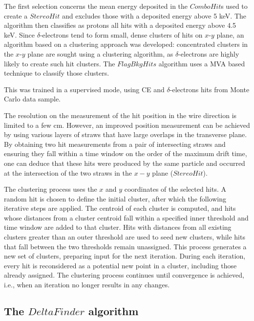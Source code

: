 The first selection concerns the 
mean energy deposited in  
the $ComboHit$s used to create a 
$StereoHit$ and excludes 
those with a deposited energy above 5 keV. 
The algorithm then classifies as 
protons all hits with a deposited 
energy above 4.5 keV.
Since $\delta$-electrons tend to form small, dense 
clusters of hits on $x$-$y$ plane, an algorithm based on a clustering 
approach was developed: concentrated clusters in the 
$x$-$y$ plane are sought using a clustering algorithm, 
as $\delta$-electrons are highly likely to create 
such hit clusters.
The $FlagBkgHits$ algorithm uses  
a MVA based technique to classify those clusters.

This was trained in a supervised mode, 
using CE and $\delta$-electrons hits from 
Monte Carlo data sample.

The resolution on the measurement of the 
hit position in the wire direction is limited to a few cm. 
However, an improved position measurement can be 
achieved by using various layers of straws that have large overlaps in the transverse plane. 
By obtaining two hit measurements from a pair of 
intersecting straws and ensuring they fall within 
a time window on the order of the maximum drift time, 
one can deduce that these hits were produced by the 
same particle and occurred at the intersection of the 
two straws in the $x-y$ plane ($StereoHit$).

The clustering process uses the $x$ and $y$ coordinates 
of the selected hits. A random hit is chosen to define 
the initial cluster, after which the following iterative 
steps are applied. The centroid of each cluster is 
computed, and hits whose distances from a cluster 
centroid fall within a specified inner threshold 
and time window are added to that cluster. Hits 
with distances from all existing clusters greater 
than an outer threshold are used to seed new 
clusters, while hits that fall between the two 
thresholds remain unassigned. This process 
generates a new set of clusters, preparing input 
for the next iteration. During each 
iteration, every hit is reconsidered as a 
potential new point in a cluster, including 
those already assigned. The clustering process 
continues until convergence is achieved, i.e., 
when an iteration no longer results in any changes.


\subsection{The $DeltaFinder$ algorithm}\label{deltafinder}

